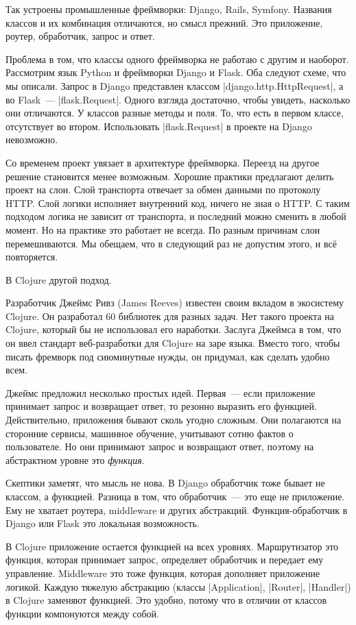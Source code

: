 Так устроены промышленные фреймворки: Django, Rails, Symfony. Названия классов и
их комбинация отличаются, но смысл прежний. Это приложение, роутер, обработчик,
запрос и ответ.

Проблема в том, что классы одного фреймворка не работаю с другим и
наоборот. Рассмотрим язык Python и фреймворки Django и Flask. Оба следуют схеме,
что мы описали. Запрос в Django представлен классом
\spverb|django.http.HttpRequest|, а во Flask~--- \spverb|flask.Request|. Одного
взгляда достаточно, чтобы увидеть, насколько они отличаются. У классов разные
методы и поля. То, что есть в первом классе, отсутствует во втором. Использовать
\spverb|flask.Request| в проекте на Django невозможно.

Со временем проект увязает в архитектуре фреймворка. Переезд на другое решение
становится менее возможным. Хорошие практики предлагают делить проект на
слои. Слой транспорта отвечает за обмен данными по протоколу HTTP. Слой логики
исполняет внутренний код, ничего не зная о HTTP. С таким подходом логика не
зависит от транспорта, и последний можно сменить в любой момент. Но на практике
это работает не всегда. По разным причинам слои перемешиваются. Мы обещаем, что
в следующий раз не допустим этого, и вс\"{е} повторяется.

В Clojure другой подход.

Разработчик Джеймс Ривз (James Reeves)
известен своим вкладом в экосистему Clojure. Он разработал 60 библиотек для
разных задач. Нет такого проекта на Clojure, который бы не использовал его
наработки. Заслуга Джеймса в том, что он ввел стандарт веб-разработки для
Clojure на заре языка. Вместо того, чтобы писать фремворк под сиюминутные нужды,
он придумал, как сделать удобно всем.

Джеймс предложил несколько простых идей. Первая~--- если приложение принимает
запрос и возвращает ответ, то резонно выразить его функцией. Действительно,
приложения бывают сколь угодно сложным. Они полагаются на сторонние сервисы,
машинное обучение, учитывают сотню фактов о пользователе. Но они принимают
запрос и возвращают ответ, поэтому на абстрактном уровне это \emph{функция}.

Скептики заметят, что мысль не нова. В Django обработчик тоже бывает не классом,
а функцией. Разница в том, что обработчик~--- это еще не приложение. Ему не
хватает роутера, middleware и других абстракций. Функция-обработчик в Django или
Flask это локальная возможность.

В Clojure приложение остается функцией на всех уровнях. Маршрутизатор это
функция, которая принимает запрос, определяет обработчик и передает ему
управление. Middleware это тоже функция, которая дополняет приложение
логикой. Каждую тяжелую абстракцию (классы \spverb|Application|,
\spverb|Router|, \spverb|Handler|) в Clojure заменяют функцией. Это удобно,
потому что в отличии от классов функции компонуются между собой.

